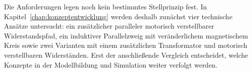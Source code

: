 Die Anforderungen legen noch kein bestimmtes Stellprinzip fest. In
Kapitel~\ref{chap:konzeptentwicklung} werden deshalb zunächst vier
technische Ansätze untersucht: ein zusätzlicher paralleler motorisch verstellbarer
Widerstandspfad, ein induktiver Parallelzweig mit veränderlichem
magnetischem Kreis sowie zwei Varianten mit einem zusätzlichen Transformator
und motorisch verstellbaren Widerständen. Erst der anschließende Vergleich
entscheidet, welche Konzepte in der Modellbildung und Simulation weiter
verfolgt werden.






